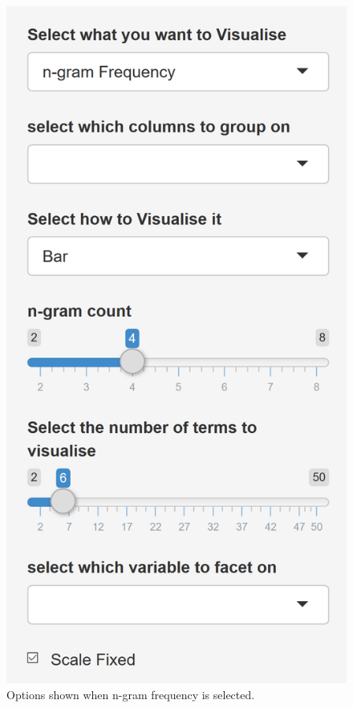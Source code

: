 \documentclass[11pt, a4paper, titlepage]{report}
\begin{document}
\begin{figure}
  \centering
  \includegraphics[scale=0.4]{visualisation-n-gram-options.PNG}
  \caption{Options shown when n-gram frequency is
    selected.\label{fig:visualisation-n-gram-options}}
\end{figure}
\end{document}
